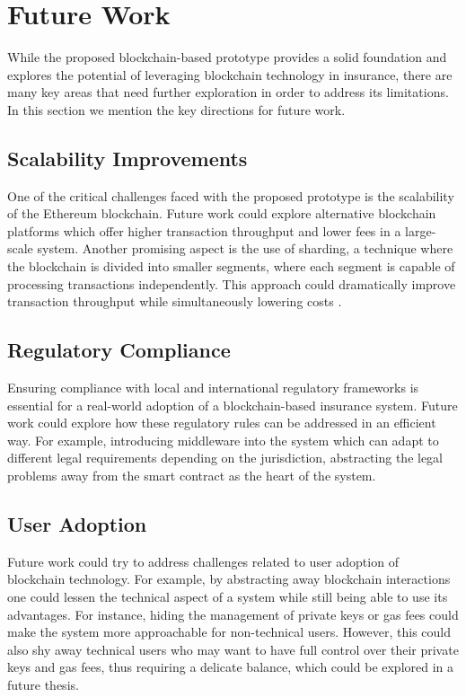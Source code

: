 \section{Future Work}\label{section:future_work}
While the proposed blockchain-based prototype provides a solid foundation and explores the potential of leveraging blockchain technology in insurance, there are many key areas that need further exploration in order to address its limitations. In this section we mention the key directions for future work.

\subsection{Scalability Improvements}
One of the critical challenges faced with the proposed prototype is the scalability of the Ethereum blockchain. Future work could explore alternative blockchain platforms which offer higher transaction throughput and lower fees in a large-scale system. Another promising aspect is the use of sharding, a technique where the blockchain is divided into smaller segments, where each segment is capable of processing transactions independently. This approach could dramatically improve transaction throughput while simultaneously lowering costs \autocite{Hong2022Scaling}.

\subsection{Regulatory Compliance}
Ensuring compliance with local and international regulatory frameworks is essential for a real-world adoption of a blockchain-based insurance system. Future work could explore how these regulatory rules can be addressed in an efficient way. For example, introducing middleware into the system which can adapt to different legal requirements depending on the jurisdiction, abstracting the legal problems away from the smart contract as the heart of the system.

\subsection{User Adoption}
Future work could try to address challenges related to user adoption of blockchain technology. For example, by abstracting away blockchain interactions one could lessen the technical aspect of a system while still being able to use its advantages. For instance, hiding the management of private keys or gas fees could make the system more approachable for non-technical users. However, this could also shy away technical users who may want to have full control over their private keys and gas fees, thus requiring a delicate balance, which could be explored in a future thesis.
